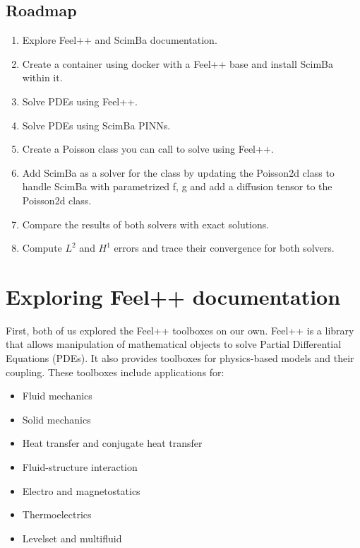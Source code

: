\documentclass[12pt]{article}
\begin{document}
\subsection{Roadmap}  
\label{sec:Roadmap}

\begin{frame}

\begin{enumerate}
    \item Explore Feel++ and ScimBa documentation.
    \item Create a container using docker with a Feel++ base and install ScimBa within it.
    \item Solve PDEs using Feel++.
    \item Solve PDEs using ScimBa PINNs.
    \item Create a Poisson class you can call to solve using Feel++.
    \item Add ScimBa as a solver for the class by updating the Poisson2d class to handle ScimBa with parametrized f, g and add a diffusion tensor to the Poisson2d class.
    \item Compare the results of both solvers with exact solutions.
    \item Compute \( L^2\) and \( H^1 \) errors and trace their convergence for both solvers.
\end{enumerate}
\end{frame}

    
\newpage 


\section{Exploring Feel++ documentation}
First, both of us explored the Feel++ toolboxes on our own.
Feel++ is a library that allows manipulation of mathematical objects to solve Partial Differential Equations (PDEs). It also provides toolboxes for physics-based models and their coupling. These toolboxes include applications for:

\begin{itemize}
    \item Fluid mechanics
    \item Solid mechanics
    \item Heat transfer and conjugate heat transfer
    \item Fluid-structure interaction
    \item Electro and magnetostatics
    \item Thermoelectrics
    \item Levelset and multifluid
\end{itemize}
\end{document}
